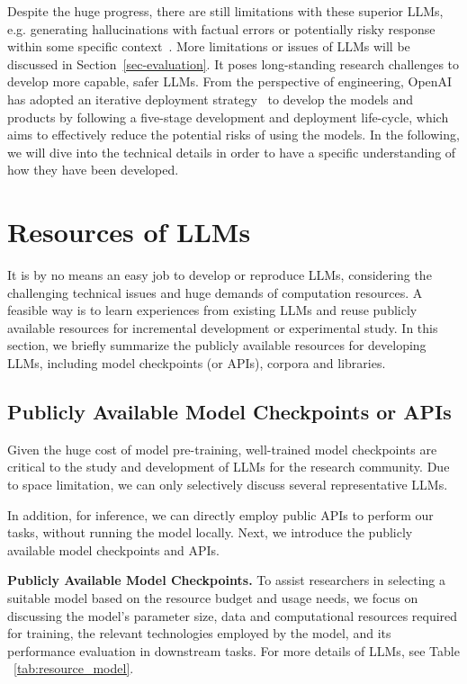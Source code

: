 Despite the huge progress, there are still limitations with these superior LLMs, e.g. generating hallucinations with factual errors or potentially risky response within some specific context~\cite{OpenAI-OpenAI-2023-GPT-4}. More limitations or issues of LLMs will be discussed in Section~\ref{sec-evaluation}. 
It poses  long-standing research challenges to develop more capable, safer LLMs. From the perspective of engineering, OpenAI has adopted an iterative deployment strategy~\cite{OpenAI-blog-2022-lessons}  to develop the models and products by following a five-stage development and deployment life-cycle, which aims to effectively reduce the potential risks of using the models. In the following, we will dive into the technical details in order to have a specific understanding of how they have been  developed. 

\section{Resources of LLMs}
\label{sec-resource}
It is by no means an easy job to develop or reproduce LLMs, considering the challenging technical issues and huge demands of computation resources. A feasible way is to learn experiences from existing LLMs and reuse publicly available resources for incremental development or experimental study.  In this section, we briefly summarize the publicly available resources for developing LLMs, including model checkpoints (or APIs), corpora and libraries.

\subsection{Publicly Available Model Checkpoints or APIs}\label{subsec-models-apis}
Given the huge cost of model pre-training, well-trained model checkpoints are critical to the study and development of LLMs for the research community. Due to space limitation, we can only selectively discuss several representative LLMs. 

In addition, for inference, we can directly employ public APIs to perform our tasks, without running the model {locally}.  Next, we introduce the publicly available model checkpoints and APIs. 

\textbf{Publicly Available Model Checkpoints.} To assist researchers in selecting a suitable model based on the resource budget and usage needs, we focus on discussing the model's parameter size, data and computational resources required for training, the relevant technologies employed by the model, and its performance evaluation in downstream tasks. For more details of LLMs, see Table ~\ref{tab:resource_model}.

